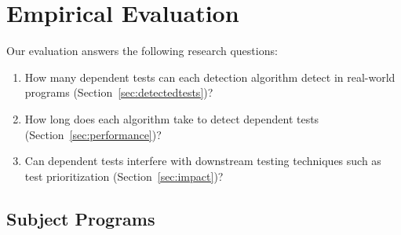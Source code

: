 \section{Empirical Evaluation}
\label{sec:evaluation}


\newcommand{\jt}{Joda-Time\xspace}

\newcommand{\jfreecharttests}{2234\xspace}%
\newcommand{\jodatimetests}{3875\xspace}
\newcommand{\xmlsecuritytests}{108\xspace}
\newcommand{\crystaltests}{75\xspace}
\newcommand{\synoptictests}{118\xspace}
\newcommand{\totaltests}{4176\xspace}

\newcommand{\jfreechartautotests}{2946\xspace}
\newcommand{\jodatimeautotests}{2639\xspace}
\newcommand{\xmlsecurityautotests}{665\xspace}
\newcommand{\crystalautotests}{3198\xspace}
\newcommand{\synopticautotests}{2467\xspace}
\newcommand{\totalautotests}{8969\xspace}




Our evaluation answers the following research questions:

\vspace{-1mm}


\begin{enumerate}
\vspace{-1mm}
\item How many dependent tests can each detection
algorithm detect in
real-world programs (Section~\ref{sec:detectedtests})?

\item How long does each algorithm take to detect dependent
tests (Section~\ref{sec:performance})?

\item Can dependent tests interfere with downstream testing techniques
such as test prioritization (Section~\ref{sec:impact})?

\end{enumerate}

\subsection{Subject Programs}


